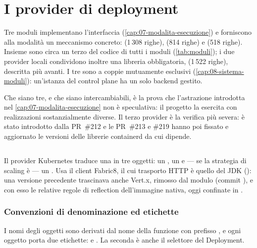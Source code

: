 \chapter{I provider di deployment}
\label{cap:15-deployment-provider}

Tre moduli implementano l'interfaccia 
(\cref{cap:07-modalita-esecuzione}) e forniscono alla modalit\`a
 un meccanismo concreto: 
(1\,308 righe),  (814 righe) e
 (518 righe). Insieme sono circa
un terzo del codice di tutti i moduli (\cref{tab:moduli}); i due provider
locali condividono inoltre una libreria obbligatoria, 
(1\,522 righe), descritta pi\`u avanti. I tre sono a coppie mutuamente esclusivi
(\cref{cap:08-sistema-moduli}): un'istanza del control plane ha un solo backend
gestito.

Che siano tre, e che siano intercambiabili, \`e la prova che l'astrazione
introdotta nel \cref{cap:07-modalita-esecuzione} non \`e speculativa: il progetto
la esercita con realizzazioni sostanzialmente diverse. Il terzo provider \`e
la verifica pi\`u severa: \`e stato introdotto dalla PR~\#212 e le PR~\#213 e
\#219 hanno poi fissato e aggiornato le versioni delle librerie containerd da cui
dipende.

\section{}

Il provider Kubernetes traduce una  in tre oggetti: un
, un  e --- se la strategia di scaling \`e
 --- un . Usa il client
Fabric8, il cui trasporto HTTP \`e quello del JDK
(): una versione precedente trascinava anche
Vert.x, rimosso dal modulo (commit ), e con esso le relative
regole di reflection dell'immagine nativa, oggi confinate in
.

\subsection{Convenzioni di denominazione ed etichette}

I nomi degli oggetti sono derivati dal nome della funzione con prefisso
, e ogni oggetto porta due etichette:  e
. La seconda \`e anche il selettore del Deployment.

